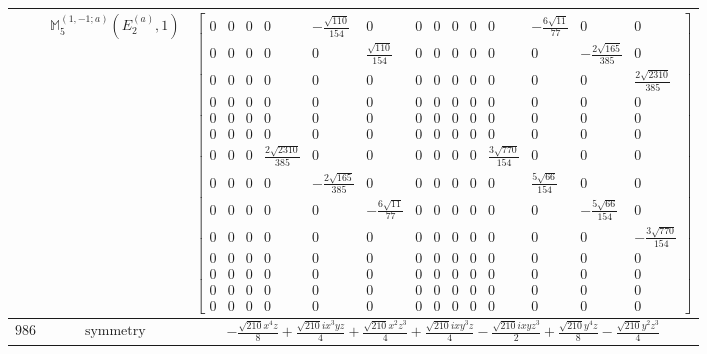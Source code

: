 \documentclass[fleqn,8pt,landscape]{jsarticle}
\begin{document}
\begin{longtable}{ccc}
$  $ & $ \mathbb{M}_{5}^{(1,-1;a)}(E_{2}^{(a)},1) $ & $ \begin{bmatrix} 0 & 0 & 0 & 0 & - \frac{\sqrt{110}}{154} & 0 & 0 & 0 & 0 & 0 & 0 & - \frac{6 \sqrt{11}}{77} & 0 & 0 \\ 0 & 0 & 0 & 0 & 0 & \frac{\sqrt{110}}{154} & 0 & 0 & 0 & 0 & 0 & 0 & - \frac{2 \sqrt{165}}{385} & 0 \\ 0 & 0 & 0 & 0 & 0 & 0 & 0 & 0 & 0 & 0 & 0 & 0 & 0 & \frac{2 \sqrt{2310}}{385} \\ 0 & 0 & 0 & 0 & 0 & 0 & 0 & 0 & 0 & 0 & 0 & 0 & 0 & 0 \\ 0 & 0 & 0 & 0 & 0 & 0 & 0 & 0 & 0 & 0 & 0 & 0 & 0 & 0 \\ 0 & 0 & 0 & 0 & 0 & 0 & 0 & 0 & 0 & 0 & 0 & 0 & 0 & 0 \\ 0 & 0 & 0 & \frac{2 \sqrt{2310}}{385} & 0 & 0 & 0 & 0 & 0 & 0 & \frac{3 \sqrt{770}}{154} & 0 & 0 & 0 \\ 0 & 0 & 0 & 0 & - \frac{2 \sqrt{165}}{385} & 0 & 0 & 0 & 0 & 0 & 0 & \frac{5 \sqrt{66}}{154} & 0 & 0 \\ 0 & 0 & 0 & 0 & 0 & - \frac{6 \sqrt{11}}{77} & 0 & 0 & 0 & 0 & 0 & 0 & - \frac{5 \sqrt{66}}{154} & 0 \\ 0 & 0 & 0 & 0 & 0 & 0 & 0 & 0 & 0 & 0 & 0 & 0 & 0 & - \frac{3 \sqrt{770}}{154} \\ 0 & 0 & 0 & 0 & 0 & 0 & 0 & 0 & 0 & 0 & 0 & 0 & 0 & 0 \\ 0 & 0 & 0 & 0 & 0 & 0 & 0 & 0 & 0 & 0 & 0 & 0 & 0 & 0 \\ 0 & 0 & 0 & 0 & 0 & 0 & 0 & 0 & 0 & 0 & 0 & 0 & 0 & 0 \\ 0 & 0 & 0 & 0 & 0 & 0 & 0 & 0 & 0 & 0 & 0 & 0 & 0 & 0 \end{bmatrix} $ \\ \hline
$ 986 $ & $ \text{symmetry} $ & $ - \frac{\sqrt{210} x^{4} z}{8} + \frac{\sqrt{210} i x^{3} y z}{4} + \frac{\sqrt{210} x^{2} z^{3}}{4} + \frac{\sqrt{210} i x y^{3} z}{4} - \frac{\sqrt{210} i x y z^{3}}{2} + \frac{\sqrt{210} y^{4} z}{8} - \frac{\sqrt{210} y^{2} z^{3}}{4} $ \\

\end{longtable}
\end{document}
